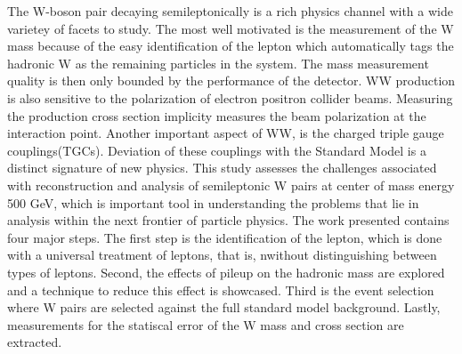 The W-boson pair decaying semileptonically is a rich physics channel with a wide varietey of facets to study. The most well motivated is the measurement of the W mass because of the easy identification of the lepton which automatically tags the hadronic W as the remaining particles in the system. The mass measurement quality is then only bounded by the performance of the detector. WW production is also sensitive to the polarization of electron positron collider beams.  Measuring the production cross section  implicity measures the beam polarization at the interaction point. Another important aspect of WW, is the charged triple gauge couplings(TGCs). Deviation of these couplings with the Standard Model is a distinct signature of new physics. This study assesses the challenges associated with reconstruction and analysis of semileptonic W pairs at center of mass energy 500 GeV, which is important tool in understanding the problems that lie in analysis within the next frontier of particle physics. The work presented contains four major steps. The first step is the identification of the lepton, which is done with a universal treatment of leptons, that is, nwithout distinguishing between types of leptons.  Second, the effects of pileup on the hadronic mass are explored and a technique to reduce this effect is showcased. Third is the event selection where W pairs are selected against the full standard model background. Lastly, measurements for the statiscal error of the W mass and cross section are extracted.